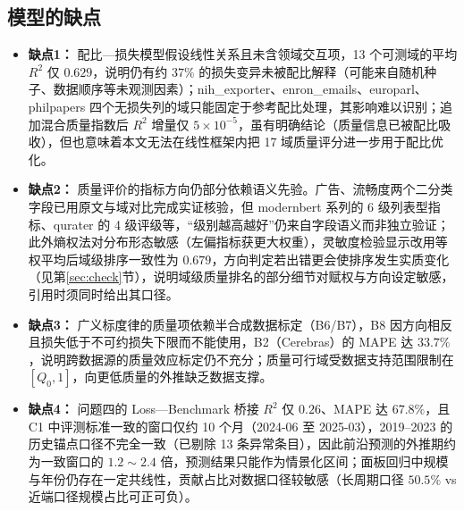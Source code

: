 \subsection{模型的缺点}
\begin{itemize}[itemindent=2em]
\item \textbf{缺点1：} 配比—损失模型假设线性关系且未含领域交互项，13 个可测域的平均 $R^2$ 仅 $0.629$，说明仍有约 $37\%$ 的损失变异未被配比解释（可能来自随机种子、数据顺序等未观测因素）；nih\_exporter、enron\_emails、europarl、philpapers 四个无损失列的域只能固定于参考配比处理，其影响难以识别；追加混合质量指数后 $R^2$ 增量仅 $5\times10^{-5}$，虽有明确结论（质量信息已被配比吸收），但也意味着本文无法在线性框架内把 17 域质量评分进一步用于配比优化。
\item \textbf{缺点2：} 质量评价的指标方向仍部分依赖语义先验。广告、流畅度两个二分类字段已用原文与域对比完成实证核验，但 modernbert 系列的 6 级列表型指标、qurater 的 4 级评级等，“级别越高越好”仍来自字段语义而非独立验证；此外熵权法对分布形态敏感（左偏指标获更大权重），灵敏度检验显示改用等权平均后域级排序一致性为 $0.679$，方向判定若出错更会使排序发生实质变化（见第\ref{sec:check}节），说明域级质量排名的部分细节对赋权与方向设定敏感，引用时须同时给出其口径。
\item \textbf{缺点3：} 广义标度律的质量项依赖半合成数据标定（B6/B7），B8 因方向相反且损失低于不可约损失下限而不能使用，B2（Cerebras）的 MAPE 达 $33.7\%$，说明跨数据源的质量效应标定仍不充分；质量可行域受数据支持范围限制在 $[Q_0,1]$，向更低质量的外推缺乏数据支撑。
\item \textbf{缺点4：} 问题四的 Loss—Benchmark 桥接 $R^2$ 仅 $0.26$、MAPE 达 $67.8\%$，且 C1 中评测标准一致的窗口仅约 10 个月（2024-06 至 2025-03），2019--2023 的历史锚点口径不完全一致（已剔除 13 条异常条目），因此前沿预测的外推期约为一致窗口的 $1.2\sim2.4$ 倍，预测结果只能作为情景化区间；面板回归中规模与年份仍存在一定共线性，贡献占比对数据口径较敏感（长周期口径 $50.5\%$ vs 近端口径规模占比可正可负）。
\end{itemize}
